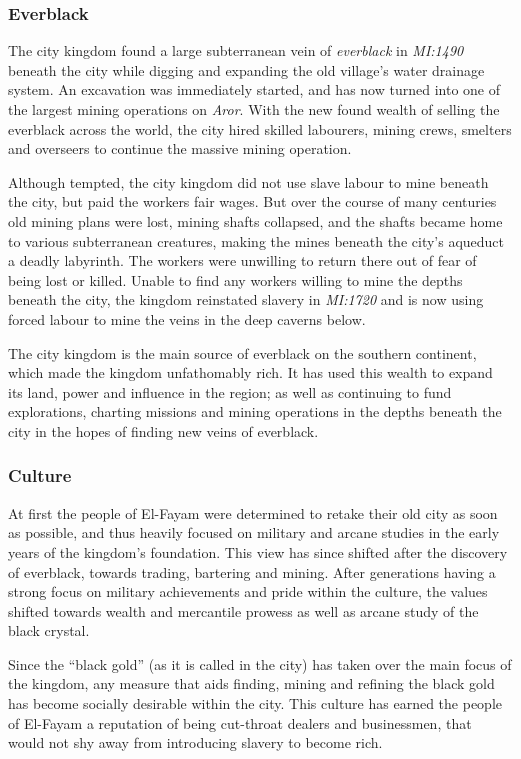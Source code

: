 \subsubsection{Everblack}

The city kingdom found a large subterranean vein of \emph{everblack} in
\emph{MI:1490} beneath the city while digging and expanding the old village's
water drainage system. An excavation was immediately started, and has now
turned into one of the largest mining operations on \emph{Aror}. With the new
found wealth of selling the everblack across the world, the city hired skilled
labourers, mining crews, smelters and overseers to continue the massive mining
operation.

Although tempted, the city kingdom did not use slave labour to mine beneath
the city, but paid the workers fair wages. But over the course of many
centuries old mining plans were lost, mining shafts collapsed, and the shafts
became home to various subterranean creatures, making the mines beneath the
city's aqueduct a deadly labyrinth. The workers were unwilling to return
there out of fear of being lost or killed. Unable to find any workers willing
to mine the depths beneath the city, the kingdom reinstated slavery in
\emph{MI:1720} and is now using forced labour to mine the veins in the deep
caverns below.

The city kingdom is the main source of everblack on the southern continent,
which made the kingdom unfathomably rich. It has used this wealth to expand
its land, power and influence in the region; as well as continuing to fund
explorations, charting missions and mining operations in the depths beneath
the city in the hopes of finding new veins of everblack.

\subsubsection{Culture}

At first the people of El-Fayam were determined to retake their old city as
soon as possible, and thus heavily focused on military and arcane studies in
the early years of the kingdom's foundation. This view has since shifted after
the discovery of everblack, towards trading, bartering and mining. After
generations having a strong focus on military achievements and pride within
the culture, the values shifted towards wealth and mercantile prowess as well
as arcane study of the black crystal.

Since the ``black gold'' (as it is called in the city) has taken over the main
focus of the kingdom, any measure that aids finding, mining and refining the
black gold has become socially desirable within the city. This culture has
earned the people of El-Fayam a reputation of being cut-throat dealers and
businessmen, that would not shy away from introducing slavery to become rich.

